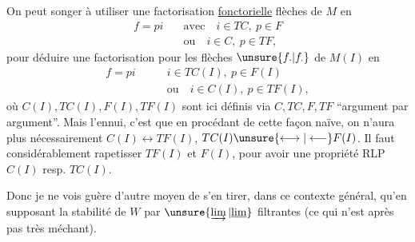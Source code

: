 On peut songer à utiliser une factorisation \uline{fonctorielle}  flèches de $M$ en
\[
\begin{aligned}
f=pi\quad &\text{avec}\quad i\in TC,\ p\in F\\
&\text{ou}\quad i\in C,\ p\in TF,
\end{aligned}
\]
pour déduire une factorisation  pour les flèches $\unsure{f.|f_{\cdot}}$ de $M(I)$ en
\[
\begin{aligned}
f=pi\qquad &i\in TC(I),\ p\in F(I)\\
&\text{ou}\quad i\in C(I),\ p\in TF(I),
\end{aligned}
\]
où $C(I),TC(I),F(I),TF(I)$ sont ici définis via $C,TC,F,TF$ ``argument par argument''. Mais l'ennui, c'est que en procédant de cette façon naïve, on n'aura plus nécessairement $C(I)\longleftrightarrow TF(I)$, $TC(I)\unsure{\longleftrightarrow|\longleftarrow} F(I)$. Il faut considérablement rapetisser $TF(I)$ et $F(I)$, pour avoir une propriété RLP  $C(I)$ resp. $TC(I)$.

Donc je ne vois guère d'autre moyen de s'en tirer, dans ce contexte général, qu'en supposant la stabilité de $W$ par $\unsure{\varinjlim|\underline{\lim}}$ filtrantes (ce qui n'est après  pas très méchant).
